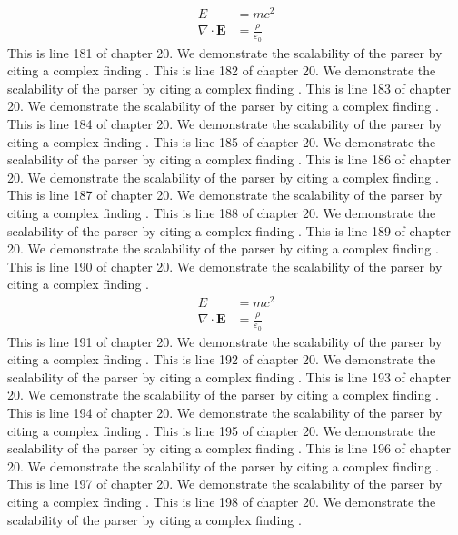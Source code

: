\begin{align*}
  E &= mc^2 \\
  \nabla \cdot \mathbf{E} &= \frac{\rho}{\varepsilon_0}
\end{align*}
This is line 181 of chapter 20. We demonstrate the scalability of the parser by citing a complex finding \cite{ref20_181}.
This is line 182 of chapter 20. We demonstrate the scalability of the parser by citing a complex finding \cite{ref20_182}.
This is line 183 of chapter 20. We demonstrate the scalability of the parser by citing a complex finding \cite{ref20_183}.
This is line 184 of chapter 20. We demonstrate the scalability of the parser by citing a complex finding \cite{ref20_184}.
This is line 185 of chapter 20. We demonstrate the scalability of the parser by citing a complex finding \cite{ref20_185}.
This is line 186 of chapter 20. We demonstrate the scalability of the parser by citing a complex finding \cite{ref20_186}.
This is line 187 of chapter 20. We demonstrate the scalability of the parser by citing a complex finding \cite{ref20_187}.
This is line 188 of chapter 20. We demonstrate the scalability of the parser by citing a complex finding \cite{ref20_188}.
This is line 189 of chapter 20. We demonstrate the scalability of the parser by citing a complex finding \cite{ref20_189}.
This is line 190 of chapter 20. We demonstrate the scalability of the parser by citing a complex finding \cite{ref20_190}.
\begin{align*}
  E &= mc^2 \\
  \nabla \cdot \mathbf{E} &= \frac{\rho}{\varepsilon_0}
\end{align*}
This is line 191 of chapter 20. We demonstrate the scalability of the parser by citing a complex finding \cite{ref20_191}.
This is line 192 of chapter 20. We demonstrate the scalability of the parser by citing a complex finding \cite{ref20_192}.
This is line 193 of chapter 20. We demonstrate the scalability of the parser by citing a complex finding \cite{ref20_193}.
This is line 194 of chapter 20. We demonstrate the scalability of the parser by citing a complex finding \cite{ref20_194}.
This is line 195 of chapter 20. We demonstrate the scalability of the parser by citing a complex finding \cite{ref20_195}.
This is line 196 of chapter 20. We demonstrate the scalability of the parser by citing a complex finding \cite{ref20_196}.
This is line 197 of chapter 20. We demonstrate the scalability of the parser by citing a complex finding \cite{ref20_197}.
This is line 198 of chapter 20. We demonstrate the scalability of the parser by citing a complex finding \cite{ref20_198}.
